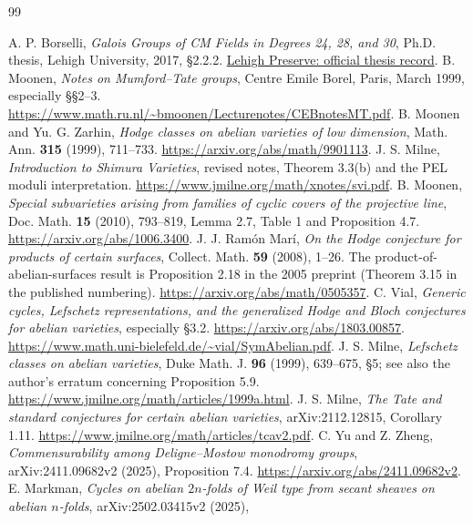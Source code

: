 \documentclass[10pt,reqno]{article}
\theoremstyle{emphasizedplain}
\theoremstyle{emphasizeddefinition}
\theoremstyle{emphasizeddefinition}
\begin{document}
\clearpage
\begin{thebibliography}{99}
A. P. Borselli, \emph{Galois Groups of CM Fields in Degrees 24, 28,
and 30}, Ph.D. thesis, Lehigh University, 2017, \S2.2.2.
\href{https://preserve.lehigh.edu/lehigh-scholarship/graduate-publications-theses-dissertations/theses-dissertations/galois-groups-cm}{Lehigh Preserve: official thesis record}.
B. Moonen, \emph{Notes on Mumford--Tate groups}, Centre Emile Borel,
Paris, March 1999, especially \S\S2--3.
\url{https://www.math.ru.nl/~bmoonen/Lecturenotes/CEBnotesMT.pdf}.
B. Moonen and Yu. G. Zarhin, \emph{Hodge classes on abelian varieties of
low dimension}, Math. Ann. \textbf{315} (1999), 711--733.
\url{https://arxiv.org/abs/math/9901113}.
J. S. Milne, \emph{Introduction to Shimura Varieties}, revised notes,
Theorem 3.3(b) and the PEL moduli interpretation.
\url{https://www.jmilne.org/math/xnotes/svi.pdf}.
B. Moonen, \emph{Special subvarieties arising from families of cyclic
covers of the projective line}, Doc. Math. \textbf{15} (2010), 793--819,
Lemma 2.7, Table 1 and Proposition 4.7.
\url{https://arxiv.org/abs/1006.3400}.
J. J. Ram\'on Mar\'i, \emph{On the Hodge conjecture for products of
certain surfaces}, Collect. Math. \textbf{59} (2008), 1--26.
The product-of-abelian-surfaces result is Proposition 2.18 in the
2005 preprint (Theorem 3.15 in the published numbering).
\url{https://arxiv.org/abs/math/0505357}.
C. Vial, \emph{Generic cycles, Lefschetz representations, and the generalized
Hodge and Bloch conjectures for abelian varieties}, especially \S3.2.
\url{https://arxiv.org/abs/1803.00857}.
\url{https://www.math.uni-bielefeld.de/~vial/SymAbelian.pdf}.
J. S. Milne, \emph{Lefschetz classes on abelian varieties},
Duke Math. J. \textbf{96} (1999), 639--675, \S5;
see also the author's erratum concerning Proposition 5.9.
\url{https://www.jmilne.org/math/articles/1999a.html}.
J. S. Milne, \emph{The Tate and standard conjectures for certain
abelian varieties}, arXiv:2112.12815, Corollary 1.11.
\url{https://www.jmilne.org/math/articles/tcav2.pdf}.
C. Yu and Z. Zheng, \emph{Commensurability among Deligne--Mostow
monodromy groups}, arXiv:2411.09682v2 (2025), Proposition 7.4.
\url{https://arxiv.org/abs/2411.09682v2}.
E. Markman, \emph{Cycles on abelian $2n$-folds of Weil type from secant
sheaves on abelian $n$-folds}, arXiv:2502.03415v2 (2025),

\end{thebibliography}
\end{document}
